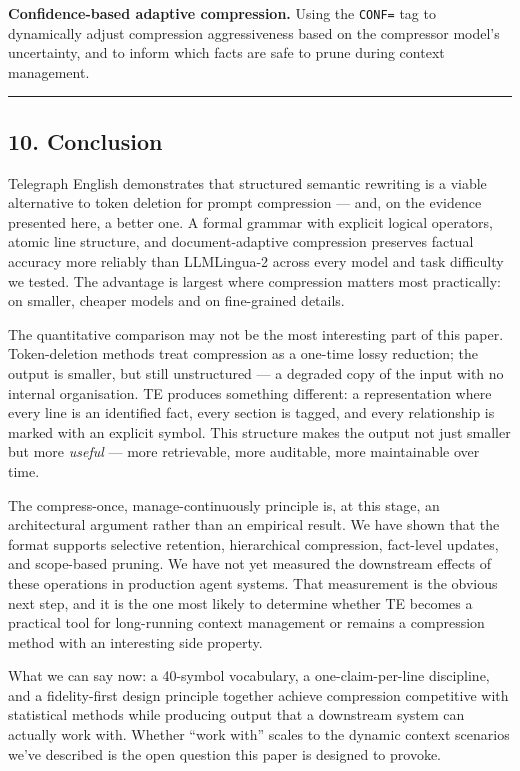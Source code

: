 \documentclass[
]{article}
\begin{document}
\textbf{Confidence-based adaptive compression.} Using the \texttt{CONF=}
tag to dynamically adjust compression aggressiveness based on the
compressor model's uncertainty, and to inform which facts are safe to
prune during context management.

\begin{center}\rule{0.5\linewidth}{0.5pt}\end{center}

\subsection{10. Conclusion}\label{conclusion}

Telegraph English demonstrates that structured semantic rewriting is a
viable alternative to token deletion for prompt compression --- and, on
the evidence presented here, a better one. A formal grammar with
explicit logical operators, atomic line structure, and document-adaptive
compression preserves factual accuracy more reliably than LLMLingua-2
across every model and task difficulty we tested. The advantage is
largest where compression matters most practically: on smaller, cheaper
models and on fine-grained details.

The quantitative comparison may not be the most interesting part of this
paper. Token-deletion methods treat compression as a one-time lossy
reduction; the output is smaller, but still unstructured --- a degraded
copy of the input with no internal organisation. TE produces something
different: a representation where every line is an identified fact,
every section is tagged, and every relationship is marked with an
explicit symbol. This structure makes the output not just smaller but
more \emph{useful} --- more retrievable, more auditable, more
maintainable over time.

The compress-once, manage-continuously principle is, at this stage, an
architectural argument rather than an empirical result. We have shown
that the format supports selective retention, hierarchical compression,
fact-level updates, and scope-based pruning. We have not yet measured
the downstream effects of these operations in production agent systems.
That measurement is the obvious next step, and it is the one most likely
to determine whether TE becomes a practical tool for long-running
context management or remains a compression method with an interesting
side property.

What we can say now: a 40-symbol vocabulary, a one-claim-per-line
discipline, and a fidelity-first design principle together achieve
compression competitive with statistical methods while producing output
that a downstream system can actually work with. Whether ``work with''
scales to the dynamic context scenarios we've described is the open
question this paper is designed to provoke.
\end{document}
